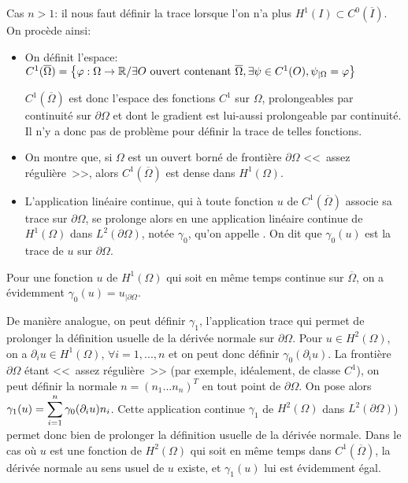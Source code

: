 \medskip
Cas $n>1$:
il nous faut définir la trace lorsque l'on n'a plus $H^1(I)\subset C^0(\overline{I})$.
On procède ainsi:
\begin{itemize}
   \item On définit l'espace:
	$C^1(\overline{\Omega}) = \left\{\varphi:\Omega\rightarrow\mathbb R/ \exists O
	\text{ ouvert contenant } \overline{\Omega}, \exists \psi\in C^1(O), \psi_{|\Omega}=\varphi
	\right\}$

	$C^1(\overline{\Omega})$ est donc l'espace des fonctions $C^1$ sur $\Omega$, prolongeables
	par continuité sur $\partial\Omega$ et dont le gradient est lui-aussi prolongeable par continuité.
	Il n'y a donc pas de problème pour définir la trace de telles fonctions.
   \item On montre que, si $\Omega$ est un ouvert borné de frontière $\partial\Omega$
	<<~assez régulière~>>, alors $C^1(\overline{\Omega})$ est dense dans $H^1(\Omega)$.
   \item L'application linéaire continue, qui à toute fonction $u$ de $C^1(\overline{\Omega})$
	associe sa trace sur $\partial\Omega$, se prolonge alors en une application linéaire continue
	de $H^1(\Omega)$ dans $L^2(\partial\Omega)$, notée $\gamma_0$, qu'on appelle
	. On dit que $\gamma_0(u)$ est la trace de $u$ sur
	$\partial\Omega$.
\end{itemize}
Pour une fonction $u$ de $H^1(\Omega)$ qui soit en même temps continue sur $\overline{\Omega}$,
on a évidemment $\gamma_0(u) = u_{|\partial\Omega}$. 

\medskip
De manière analogue, on peut définir $\gamma_1$, l'application trace qui permet de
prolonger la définition usuelle de la dérivée normale sur $\partial\Omega$.
Pour $u\in H^2(\Omega)$, on a $\partial_iu\in H^1(\Omega)$, $\forall i=1, ..., n$ et
on peut donc définir $\gamma_0(\partial_iu)$. La frontière $\partial\Omega$
étant <<~assez régulière~>> (par exemple, idéalement, de classe $C^1$),
on peut définir la normale $n = (n_1 ... n_n)^T$ en tout point de $\partial\Omega$.
On pose alors $\gamma_1(u) = \displaystyle\sum_{i=1}^n \gamma_0(\partial_iu)n_i$.
Cette application continue $\gamma_1$ de $H^2(\Omega)$ dans $L^2(\partial\Omega)$)
permet donc bien de prolonger la définition usuelle de la dérivée normale.
Dans le cas où $u$ est une fonction de $H^2(\Omega)$ qui soit en même temps
dans $C^1(\overline{\Omega})$, la dérivée normale au sens usuel de $u$ existe,
et $\gamma_1(u)$ lui est évidemment égal.

